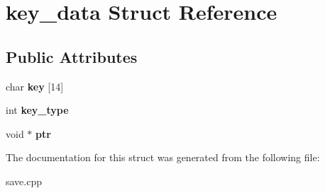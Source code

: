 \hypertarget{structkey__data}{\section{key\-\_\-data Struct Reference}
\label{structkey__data}
}
\subsection*{Public Attributes}
\begin{DoxyCompactItemize}
\item 
\hypertarget{structkey__data_a85a3a42fc62d9e21534cac2d4915d1de}{char {\bfseries key} \mbox{[}14\mbox{]}}\label{structkey__data_a85a3a42fc62d9e21534cac2d4915d1de}

\item 
\hypertarget{structkey__data_ad6f069760d712a5cbdd76db56941dfc8}{int {\bfseries key\-\_\-type}}\label{structkey__data_ad6f069760d712a5cbdd76db56941dfc8}

\item 
\hypertarget{structkey__data_a4a9c8d47812fb7e7d77ac7a51cf5994e}{void $\ast$ {\bfseries ptr}}\label{structkey__data_a4a9c8d47812fb7e7d77ac7a51cf5994e}

\end{DoxyCompactItemize}


The documentation for this struct was generated from the following file\-:\begin{DoxyCompactItemize}
\item 
save.\-cpp\end{DoxyCompactItemize}
